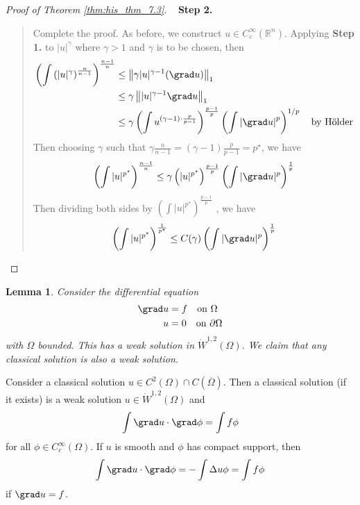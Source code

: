 \documentclass[10pt, oneside, reqno]{amsart}
\theoremstyle{plain}%
\newtheorem{lem}[thm]{Lemma}
\numberwithin{equation}{section}
\theoremstyle{definition}
\theoremstyle{remark}
\newcommand{\R}{\mathbb{R}}
\begin{document}
\begin{proof}[Proof of Theorem \ref{thm:his_thm_7.3}]{\ }
    \textbf{Step 2.}
    \begin{quote}
 Complete the proof.  As before, we construct $u \in C^\infty_c(\R^n)$.  Applying \textbf{Step 1.} to $|u|^\gamma$ where $\gamma > 1$ and $\gamma$ is to be chosen, then \begin{align*}
        \left( \int \left( |u|^\gamma \right)^{\frac{n}{n-1}} \right)^{\frac{n-1}{n}} &\leq \left\| \gamma |u|^{\gamma - 1} (\grad u) \right\|_1 \\
        &\leq \gamma \left\| |u|^{\gamma - 1} \grad u \right\|_1 \\
        &\leq \gamma \left( \int u^{(\gamma - 1) \cdot \frac{p}{p-1}}\right)^{\frac{p-1}{p}} \left( \int \left| \grad u \right|^p \right)^{1/p} \quad \text{by H\"older}
    \end{align*} 
     Then choosing $\gamma$ such that $\gamma \frac{n}{n-1} = \left( \gamma - 1 \right) \frac{p}{p-1} = p^\star$,  we have \begin{align*}
        \left( \int |u|^{p^\star} \right)^{\frac{n-1}{n}} \leq \gamma \left( |u|^{p^\star} \right)^{\frac{p-1}{p}} \left( \int |\grad u |^p \right)^{\frac{1}{p}}
    \end{align*}  Then dividing both sides by $\left(\int |u|^{p^\star} \right)^{\frac{p-1}{p}}$ , we have \begin{align*}
        \left(\int|u|^{p^\star} \right)^{\frac{1}{p^\star}} \leq C(\gamma) \left(\int |\grad u |^p \right)^{\frac{1}{p}}
    \end{align*}

    \end{quote}

\end{proof}


\begin{lem}
    Consider the differential equation \begin{align*}
        \grad u &= f \quad \text{on $\Omega$} \\
        u &= 0  \quad \text{on $\partial \Omega$}
    \end{align*} with $\Omega$ bounded.  This has a weak solution in $\dot W^{1, 2}(\Omega)$.  We claim that any classical solution is also a weak solution.
\end{lem}


Consider a classical solution $u \in C^2(\Omega) \cap C(\overline \Omega)$.  Then a classical solution (if it exists) is a weak solution $u \in \dot W^{1, 2}(\Omega)$ and \[
    \int \grad u \cdot \grad \phi = \int f \phi
\]  for all $\phi \in C^\infty_c(\Omega)$.  If $u$ is smooth and $\phi$ has compact support, then \[
    \int \grad u \cdot \grad \phi = - \int \Delta u \phi = \int f \phi
\] if $\grad u = f$. 
\end{document}
